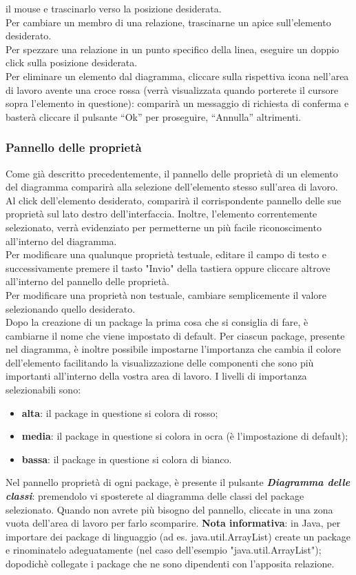 \documentclass[../ManualeUtente.tex]{subfiles}
\begin{document}
				il mouse e trascinarlo verso la posizione desiderata.\\
				Per cambiare un membro di una relazione, trascinarne un apice sull'elemento
				desiderato.\\
				Per spezzare una relazione in un punto specifico della linea, eseguire un doppio click sulla
				posizione desiderata.\\
				Per eliminare un elemento dal diagramma, cliccare sulla rispettiva icona nell'area di lavoro
				avente una croce rossa (verrà visualizzata quando porterete il cursore sopra l'elemento in questione):
				comparirà un messaggio di richiesta di conferma e basterà cliccare il pulsante ``Ok'' per proseguire,
				``Annulla'' altrimenti.
			\subsubsection{Pannello delle proprietà}
				Come già descritto precedentemente, il pannello delle proprietà di un elemento del diagramma comparirà
				alla selezione dell'elemento stesso sull'area di lavoro.\\
				Al click dell'elemento desiderato, comparirà il corrispondente pannello delle sue proprietà sul lato
				destro dell'interfaccia. Inoltre, l'elemento correntemente selezionato, verrà evidenziato per permetterne
				un più facile riconoscimento all'interno del diagramma.\\
				Per modificare una qualunque proprietà testuale, editare il campo di testo e successivamente premere il
				tasto "Invio" della tastiera oppure cliccare altrove all'interno del pannello delle proprietà.\\
				Per modificare una proprietà non testuale, cambiare semplicemente il valore selezionando quello
				desiderato.\\
				Dopo la creazione di un package la prima cosa che si consiglia di fare, è cambiarne il nome che viene
				impostato di default. Per ciascun package, presente nel diagramma, è inoltre possibile impostarne
				l'importanza che cambia il colore dell'elemento facilitando la visualizzazione delle componenti
				che sono più importanti all'interno della vostra area di lavoro.
				I livelli di importanza selezionabili sono:
				\begin{itemize}
					\item \textbf{alta}: il package in questione si colora di rosso;
					\item \textbf{media}: il package in questione si colora in ocra (è l'impostazione di default);
					\item \textbf{bassa}: il package in questione si colora di bianco.
				\end{itemize}
				Nel pannello proprietà di ogni package, è presente il pulsante
				\textit{\textbf{Diagramma delle classi}}: premendolo vi sposterete al diagramma delle classi
				del package selezionato.
				Quando non avrete più bisogno del pannello, cliccate in una zona vuota dell'area di lavoro per farlo
				scomparire.
				\textbf{Nota informativa}: in Java, per importare dei package di linguaggio (ad es. java.util.ArrayList)
				create un package e rinominatelo adeguatamente (nel caso dell'esempio "java.util.ArrayList");
				dopodichè collegate i package che ne sono dipendenti con l'apposita relazione.
		\newpage
\end{document}
